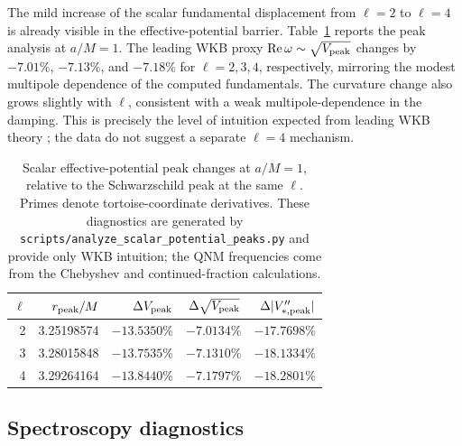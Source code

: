 \documentclass[12pt,a4paper]{article}
\begin{document}
\color{blue}
The mild increase of the scalar fundamental displacement from \(\ell=2\) to
\(\ell=4\) is already visible in the effective-potential barrier.
Table~\ref{tab:potentialpeaks} reports the peak analysis
at \(a/M=1\).  The leading WKB proxy
\(\operatorname{Re}\omega\sim\sqrt{V_{\rm peak}}\) changes by \(-7.01\%\),
\(-7.13\%\), and \(-7.18\%\) for \(\ell=2,3,4\), respectively, mirroring the
modest multipole dependence of the computed fundamentals.  The curvature
change also grows slightly with \(\ell\), consistent with a weak
multipole-dependence in the damping. This is precisely the level of intuition
expected from leading WKB theory \cite{Ferrari1984,Konoplya2003}; the data do
not suggest a separate \(\ell=4\) mechanism.

\begin{table}[H]
\centering
\footnotesize
\begin{tabular}{rrrrr}
\toprule
\(\ell\) & \(r_{\rm peak}/M\) & \(\Delta V_{\rm peak}\) &
\(\Delta\sqrt{V_{\rm peak}}\) & \(\Delta|V''_{*,\rm peak}|\)\\
\midrule
2 & 3.25198574 & \(-13.5350\%\) & \(-7.0134\%\) & \(-17.7698\%\)\\
3 & 3.28015848 & \(-13.7535\%\) & \(-7.1310\%\) & \(-18.1334\%\)\\
4 & 3.29264164 & \(-13.8440\%\) & \(-7.1797\%\) & \(-18.2801\%\)\\
\bottomrule
\end{tabular}
\caption{Scalar effective-potential peak changes at \(a/M=1\), relative to
the Schwarzschild peak at the same \(\ell\).  Primes denote tortoise-coordinate
derivatives.  These diagnostics are generated by
\texttt{scripts/analyze\_scalar\_potential\_peaks.py} and provide only WKB
intuition; the QNM frequencies come from the Chebyshev and continued-fraction
calculations.}
\label{tab:potentialpeaks}
\end{table}
\color{black}

\subsection{Spectroscopy diagnostics}
\end{document}
